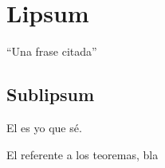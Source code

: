 \chapter{Lipsum}\label{cap:lipsum}

\enquote{Una frase citada}
\lipsum
\section{Sublipsum}\label{sec:sublipsum}
El  es yo que sé.

\lipsum

El  referente a los teoremas, bla


\endinput